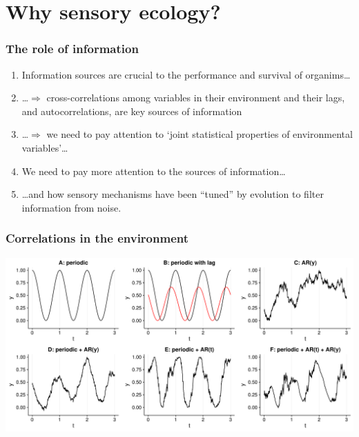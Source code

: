 \documentclass[10pt]{beamer}\usepackage[]{graphicx}\usepackage[]{color}
\begin{document}
\section{Why sensory ecology?}


\begin{frame}%
\frametitle{The role of information}
\begin{enumerate}
  \item Information sources are crucial to the performance and survival of organims\ldots
  \item \ldots $\Rightarrow$ cross-correlations among variables in their environment and their lags, and autocorrelations, are key sources of information
  \item \ldots $\Rightarrow$ we need to pay attention to `joint statistical properties of environmental variables'\ldots
  \item We need to pay more attention to the sources of information\ldots
  \item \ldots and how sensory mechanisms have been ``tuned'' by evolution to filter information from noise.
\end{enumerate}
\end{frame}

\begin{frame}
  \frametitle{Correlations in the environment}
  \includegraphics[width=\linewidth]{figures/cor_examples2.pdf}
\end{frame}
\end{document}
